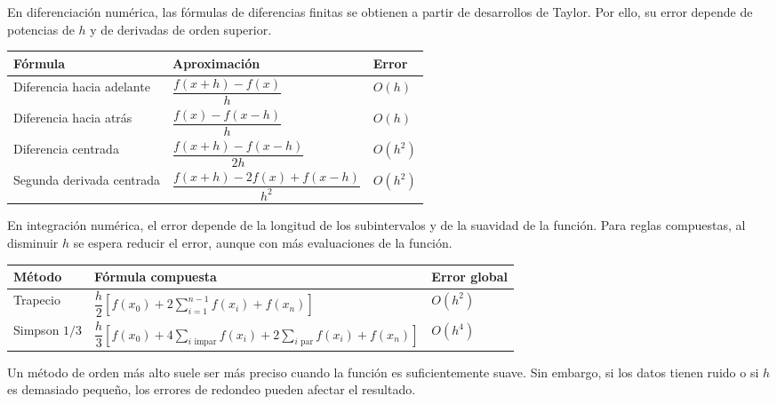 \documentclass[a4,11pt]{aleph-notas}
\begin{document}
En diferenciación numérica, las fórmulas de diferencias finitas se obtienen a partir de desarrollos de Taylor. Por ello, su error depende de potencias de $h$ y de derivadas de orden superior.

\begin{center}
\small
\begin{tabular}{p{}p{}p{}}
\toprule
Fórmula & Aproximación & Error \\
\midrule
Diferencia hacia adelante & $\dfrac{f(x+h)-f(x)}{h}$ & $O(h)$ \\[4mm]
Diferencia hacia atrás & $\dfrac{f(x)-f(x-h)}{h}$ & $O(h)$ \\[4mm]
Diferencia centrada & $\dfrac{f(x+h)-f(x-h)}{2h}$ & $O(h^2)$ \\[4mm]
Segunda derivada centrada & $\dfrac{f(x+h)-2f(x)+f(x-h)}{h^2}$ & $O(h^2)$ \\[2mm]
\bottomrule
\end{tabular}
\end{center}

\begin{defi}
    En integración numérica, el error depende de la longitud de los subintervalos y de la suavidad de la función. Para reglas compuestas, al disminuir $h$ se espera reducir el error, aunque con más evaluaciones de la función.
\end{defi}

\begin{center}
\small
\begin{tabular}{p{}p{}p{}}
\toprule
Método & Fórmula compuesta & Error global \\
\midrule
Trapecio & $\dfrac{h}{2}\left[f(x_0)+2\displaystyle\sum_{i=1}^{n-1}f(x_i)+f(x_n)\right]$ & $O(h^2)$ \\[6mm]
Simpson $1/3$ & $\dfrac{h}{3}\left[f(x_0)+4\displaystyle\sum_{i\text{ impar}}f(x_i)+2\displaystyle\sum_{i\text{ par}}f(x_i)+f(x_n)\right]$ & $O(h^4)$ \\[7mm]
\bottomrule
\end{tabular}
\end{center}

\begin{advertencia}
    Un método de orden más alto suele ser más preciso cuando la función es suficientemente suave. Sin embargo, si los datos tienen ruido o si $h$ es demasiado pequeño, los errores de redondeo pueden afectar el resultado.
\end{advertencia}
\end{document}
